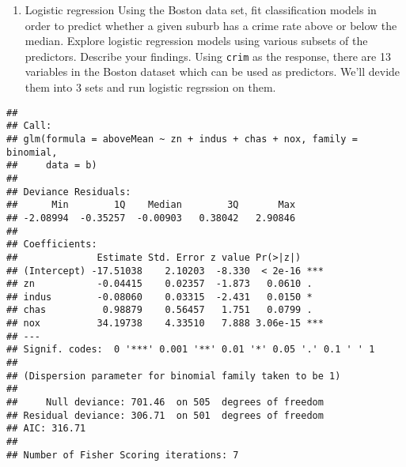 \documentclass[]{article}
\newenvironment{Shaded}{\begin{snugshade}}{\end{snugshade}}
\newcommand{\KeywordTok}[1]{\textcolor[rgb]{0.13,0.29,0.53}{\textbf{#1}}}
\newcommand{\DataTypeTok}[1]{\textcolor[rgb]{0.13,0.29,0.53}{#1}}
\newcommand{\DecValTok}[1]{\textcolor[rgb]{0.00,0.00,0.81}{#1}}
\newcommand{\CommentTok}[1]{\textcolor[rgb]{0.56,0.35,0.01}{\textit{#1}}}
\newcommand{\OperatorTok}[1]{\textcolor[rgb]{0.81,0.36,0.00}{\textbf{#1}}}
\newcommand{\NormalTok}[1]{#1}
\providecommand{\tightlist}{%
  \setlength{\itemsep}{0pt}\setlength{\parskip}{0pt}}
\begin{document}
\begin{enumerate}
\def\labelenumi{\arabic{enumi}.}
\setcounter{enumi}{4}
\tightlist
\item
  Logistic regression Using the Boston data set, fit classification
  models in order to predict whether a given suburb has a crime rate
  above or below the median. Explore logistic regression models using
  various subsets of the predictors. Describe your findings. Using
  \texttt{crim} as the response, there are 13 variables in the Boston
  dataset which can be used as predictors. We'll devide them into 3 sets
  and run logistic regrssion on them.
\end{enumerate}

\begin{Shaded}
\end{Shaded}

\begin{verbatim}
## 
## Call:
## glm(formula = aboveMean ~ zn + indus + chas + nox, family = binomial, 
##     data = b)
## 
## Deviance Residuals: 
##      Min        1Q    Median        3Q       Max  
## -2.08994  -0.35257  -0.00903   0.38042   2.90846  
## 
## Coefficients:
##              Estimate Std. Error z value Pr(>|z|)    
## (Intercept) -17.51038    2.10203  -8.330  < 2e-16 ***
## zn           -0.04415    0.02357  -1.873   0.0610 .  
## indus        -0.08060    0.03315  -2.431   0.0150 *  
## chas          0.98879    0.56457   1.751   0.0799 .  
## nox          34.19738    4.33510   7.888 3.06e-15 ***
## ---
## Signif. codes:  0 '***' 0.001 '**' 0.01 '*' 0.05 '.' 0.1 ' ' 1
## 
## (Dispersion parameter for binomial family taken to be 1)
## 
##     Null deviance: 701.46  on 505  degrees of freedom
## Residual deviance: 306.71  on 501  degrees of freedom
## AIC: 316.71
## 
## Number of Fisher Scoring iterations: 7
\end{verbatim}
\end{document}
